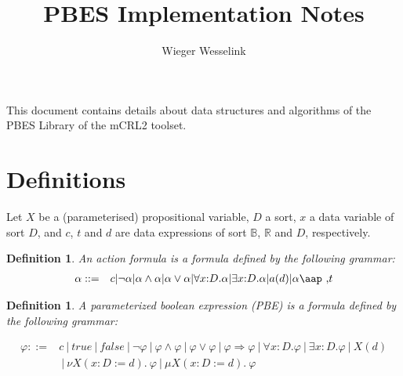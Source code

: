 \documentclass{article}
\newtheorem{definition}[theorem]{Definition}
\begin{document}
\title{PBES Implementation Notes}
\author{Wieger Wesselink}
\maketitle

This document contains details about data structures and algorithms of the
PBES Library of the mCRL2 toolset.

\section{Definitions}

Let $X$ be a (parameterised) propositional variable, $D$ a sort, $x$ a data
variable of sort $D$, and $c$, $t$ and $d$ are data expressions of sort $%
\mathbb{B}$, $\mathbb{R}$ and $D$, respectively.


\begin{definition}
An action formula is a formula defined by the following grammar:
\begin{equation*}
\begin{array}{lc}
\alpha ::= & c|\lnot \alpha |\alpha \wedge \alpha |\alpha \vee \alpha
|\forall x{:}D.\alpha |\exists x{:}D.\alpha |a(d)|\alpha \mbox{\aap ,}t%
\end{array}%
\end{equation*}
\end{definition}


\begin{definition}
A parameterized boolean expression (PBE) is a formula defined by the
following grammar:
\end{definition}

\begin{equation*}
\begin{array}{lc}
\varphi ::= & c~|~true~|~false~|~\lnot \varphi ~|~\varphi \wedge \varphi
~|~\varphi \vee \varphi ~|~\varphi \Rightarrow \varphi ~|~\forall x{:}%
D.\varphi ~|~\exists x{:}D.\varphi ~|~X(d) \\
& ~|~\nu X(x{:}D:=d).~\varphi ~|~\mu X(x{:}D:=d).~\varphi%
\end{array}%
\end{equation*}

\end{document}
